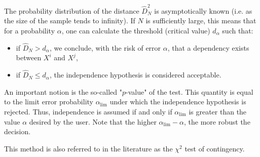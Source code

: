 {  The probability distribution of the distance $\widehat{D}_N^2$ is asymptotically known (i.e. as the size of the sample tends to infinity). If $N$ is sufficiently large, this means that for a probability $\alpha$, one can calculate the threshold (critical value) $d_\alpha$ such that:
  \begin{itemize}
  \item if $\widehat{D}_N>d_{\alpha}$, we conclude, with the risk of error $\alpha$, that a dependency exists between $X^i$ and $X^j$,
  \item if $\widehat{D}_N \leq d_{\alpha}$, the independence hypothesis is considered acceptable.
  \end{itemize}

  An important notion is the so-called "$p$-value" of the test. This quantity is equal to the limit error probability $\alpha_\textrm{lim}$ under which the independence hypothesis is rejected. Thus, independence is assumed if and only if $\alpha_\textrm{lim}$ is greater than the value $\alpha$ desired by the user. Note that the higher $\alpha_\textrm{lim} - \alpha$, the more robust the decision.

}
{
  This method is also referred to in the literature as the $\chi^2$ test of contingency.
}


